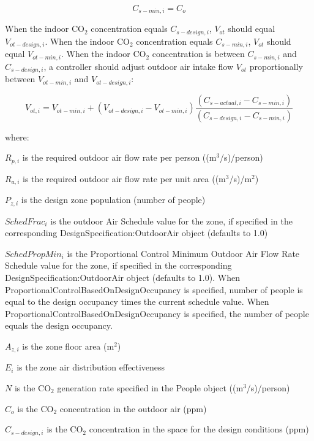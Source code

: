 \begin{equation}
{C_{s - min,i}} = {C_o}
\end{equation}

When the indoor CO\(_{2}\) concentration equals \({C_{s - design,i}}\), \({V_{ot}}\) should equal \({V_{ot - design,i}}\). When the indoor CO\(_{2}\) concentration equals \({C_{s - min,i}}\), \({V_{ot}}\) should equal \({V_{ot - min,i}}\). When the indoor CO\(_{2}\) concentration is between \({C_{s - min,i}}\) and \({C_{s - design,i}}\), a controller should adjust outdoor air intake flow \({V_{ot}}\) proportionally between \({V_{ot - min,i}}\) and \({V_{ot - design,i}}\):

\begin{equation}
{V_{ot,i}} = {V_{ot - min,i}} + ({V_{ot - design,i}} - {V_{ot - min,i}})\frac{{({C_{s - actual,i}} - {C_{s - min,i}})}}{{({C_{s - design,i}} - {C_{s - min,i}})}}
\end{equation}

where:

\({R_{p,i}}\) is the required outdoor air flow rate per person ((m\(^{3}\)/s)/person)

\({R_{a,i}}\) is the required outdoor air flow rate per unit area ((m\(^{3}\)/s)/m\(^{2}\))

\({P_{z,i}}\) is the design zone population (number of people)

\({SchedFrac_i}\) is the outdoor Air Schedule value for the zone, if specified in the corresponding DesignSpecification:OutdoorAir object (defaults to 1.0)

\({SchedPropMin_i}\) is the Proportional Control Minimum Outdoor Air Flow Rate Schedule value for the zone, if specified in the corresponding DesignSpecification:OutdoorAir object (defaults to 1.0).  When ProportionalControlBasedOnDesignOccupancy is specified, number of people is equal to the design occupancy times the current schedule value.  When ProportionalControlBasedOnDesignOccupancy is specified, the number of people equals the design occupancy.

\({A_{z,i}}\) is the zone floor area (m\(^{2}\))

\({E_i}\) is the zone air distribution effectiveness

\(N\) is the CO\(_{2}\) generation rate specified in the People object ((m\(^{3}\)/s)/person)

\({C_o}\) is the CO\(_{2}\) concentration in the outdoor air (ppm)

\({C_{s - design,i}}\) is the CO\(_{2}\) concentration in the space for the design conditions (ppm)

